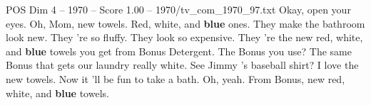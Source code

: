 \begin{textsample}{POS Dim 4 – 1970 – Score 1.00 – 1970/tv\_com\_1970\_97.txt}  \label{ex:f4_pos_035}
Okay, open your eyes.
Oh, Mom, new towels.
Red, white, and \textbf{blue} ones.
They make the bathroom look new.
They 're so fluffy.
They look so expensive.
They 're the new red, white, and \textbf{blue} towels you get from Bonus Detergent.
The Bonus you use?
The same Bonus that gets our laundry really white.
See Jimmy 's baseball shirt?
I love the new towels.
Now it 'll be fun to take a bath.
Oh, yeah.
From Bonus, new red, white, and \textbf{blue} towels.

\end{textsample}
